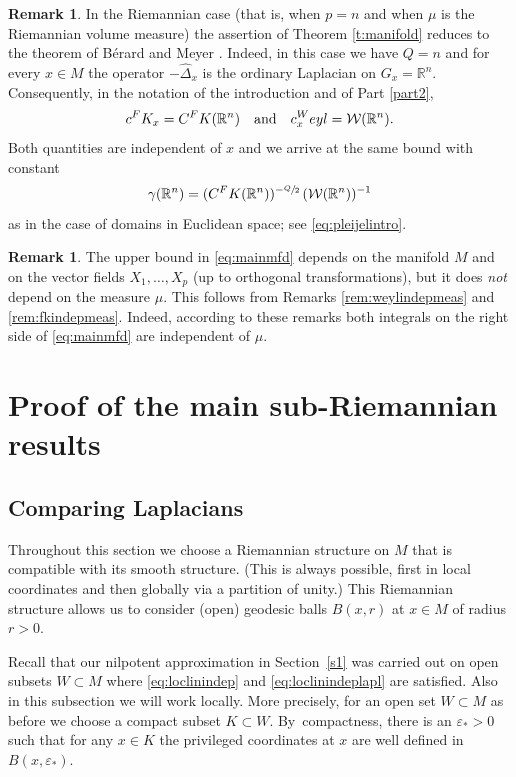 \documentclass[11pt]{article}
\let\oldsfrac\sfrac
\renewcommand{\sfrac}[2]{{\oldsfrac{#1}{#2}}}
\newcommand{\FK}{\textup{FK}}
\newcommand{\Weyl}{\textup{Weyl}}
\theoremstyle{definition}
\newtheorem{remark}[theorem]{Remark}
\let\epsilon\varepsilon
\newcommand{\1}{\mathbbm{1}}
\newcommand{\R}{\mathbb{R}}
\numberwithin{equation}{section}
\begin{document}
\begin{remark}
In the Riemannian case (that is, when $p=n$ and when $\mu$ is the Riemannian volume measure) the assertion of Theorem \ref{t:manifold} reduces to the theorem of Bérard and Meyer \cite{BerMe}. Indeed, in this case we have $Q=n$ and for every $x\in M$ the operator $-\widehat\Delta_x$ is the ordinary Laplacian on $G_x=\R^n$. Consequently, in the notation of the introduction and of Part \ref{part2},
\[
c^\FK_x = C^\FK(\R^n)
\quad\text{and}\quad
c_x^\Weyl = \mathcal W(\R^n).
\]
Both quantities are independent of $x$ and we arrive at the same bound with constant
\[
\gamma(\R^n) = (C^\FK(\R^n))^{-\sfrac Q2} \,(\mathcal W(\R^n))^{-1}
\]
as in the case of domains in Euclidean space; see \eqref{eq:pleijelintro}.
\end{remark}

\begin{remark}\label{rem:indepmeas}
The upper bound in \eqref{eq:mainmfd} depends on the manifold $M$ and on the vector fields $X_1,\ldots, X_p$ (up to orthogonal transformations), but it does \emph{not} depend on the measure $\mu$. This follows from Remarks \ref{rem:weylindepmeas} and \ref{rem:fkindepmeas}. Indeed, according to these remarks both integrals on the right side of \eqref{eq:mainmfd} are independent of $\mu$.
\end{remark}

\section{Proof of the main sub-Riemannian results}
\label{sec:mainsubriemproof}

\subsection{Comparing Laplacians}\label{sec:comparinglaplacians}
Throughout this section we choose a Riemannian structure on $M$ that is compatible with its smooth structure. (This is always possible, first in local coordinates and then globally via a partition of unity.) This Riemannian structure allows us to consider (open) geodesic balls $B(x,r)$ at $x\in M$ of radius $r>0$.

Recall that our nilpotent approximation in Section~\ref{s1} was carried out on open subsets $W\subset M$ where \eqref{eq:loclinindep} and \eqref{eq:loclinindeplapl} are satisfied. Also in this subsection we will work locally. More precisely, for an open set $W\subset M$ as before we choose a compact subset $K \subset W$. By~compactness, there is an $\epsilon_*>0$ such that for any $x\in K$ the privileged coordinates at $x$ are well defined in $B(x,\epsilon_*)$.
\end{document}
